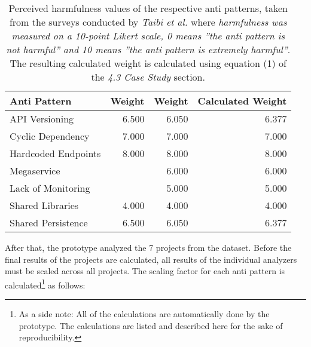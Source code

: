 \documentclass{article}
\begin{document}
\begin{table}[h!]
\begin{center}
\begin{tabular}{|l|r|r|r|}
\hline
Anti Pattern        & \multicolumn{1}{l|}{Weight \cite{taibi_definition_2018}} & \multicolumn{1}{l|}{Weight \cite{taibi_microservices_2020}} & \multicolumn{1}{l|}{Calculated Weight} \\ \hline \hline
API Versioning      & 6.500 & 6.050 & 6.377 \\ \hline
Cyclic Dependency   & 7.000 & 7.000 & 7.000 \\ \hline
Hardcoded Endpoints & 8.000 & 8.000 & 8.000 \\ \hline
Megaservice         &       & 6.000 & 6.000 \\ \hline
Lack of Monitoring  &       & 5.000 & 5.000 \\ \hline
Shared Libraries    & 4.000 & 4.000 & 4.000 \\ \hline
Shared Persistence  & 6.500 & 6.050 & 6.377 \\ \hline
\end{tabular}
\caption{Perceived harmfulness values of the respective anti patterns, taken from the surveys conducted by \textit{Taibi et al.} where \textit{harmfulness was measured on a 10-point Likert scale, 0 means ”the anti pattern is not
harmful” and 10 means ”the anti pattern is extremely harmful”}. The resulting calculated weight is calculated using equation (1) of the \textit{4.3 Case Study} section.}
\label{tab:CalculatedWeight}
\end{center}
\end{table}

After that, the prototype analyzed the 7 projects from the dataset. Before the final results of the projects are calculated, all results of the individual analyzers must be scaled across all projects. The scaling factor for each anti pattern is calculated\footnote{As a side note: All of the calculations are automatically done by the prototype. The calculations are listed and described here for the sake of reproducibility.} as follows:
\end{document}
